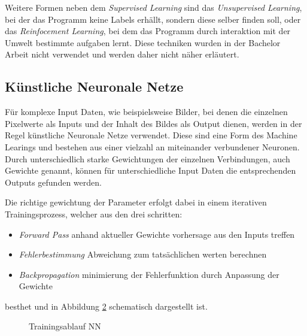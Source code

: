 Weitere Formen neben dem \textit{Supervised Learning} sind das 
\textit{Unsupervised Learning}, bei der das Programm keine Labels 
erhällt, sondern diese selber finden 
soll, oder das \textit{Reinfocement Learning}, bei dem das Programm 
durch interaktion mit der Umwelt bestimmte aufgaben lernt.
Diese techniken wurden in der Bachelor Arbeit nicht verwendet 
und werden daher nicht näher erläutert.


\subsection{Künstliche Neuronale Netze} \label{subsec:nn}

Für komplexe Input Daten, wie beispielsweise Bilder, bei denen 
die einzelnen Pixelwerte als Inputs und der Inhalt des Bildes als 
Output dienen, werden in der Regel künstliche Neuronale Netze verwendet.
Diese sind eine Form des Machine Learings und bestehen aus einer 
vielzahl an miteinander verbundener Neuronen. Durch unterschiedlich 
starke Gewichtungen der einzelnen Verbindungen, auch Gewichte genannt, 
können für unterschiedliche Input Daten die entsprechenden Outputs 
gefunden werden.

\begin{figure}[H]
    \centering
    \label{fig:nn}
    \def\svgwidth{0.65\columnwidth}
    \footnotesize
    
\end{figure}

Die richtige gewichtung der Parameter erfolgt dabei in einem iterativen Trainingsprozess, 
welcher aus den drei schritten:


\begin{itemize}
    \item \textit{Forward Pass} anhand aktueller Gewichte vorhersage aus den Inputs treffen
    \item \textit{Fehlerbestimmung} Abweichung zum tatsächlichen werten berechnen
    \item \textit{Backpropagation} minimierung der Fehlerfunktion durch Anpassung der Gewichte
\end{itemize}

besthet und in Abbildung \ref{fig:train} schematisch dargestellt ist.



\begin{figure}[H]
    \centering
    \label{fig:train}
    
    \caption{Trainingsablauf NN}
\end{figure}




